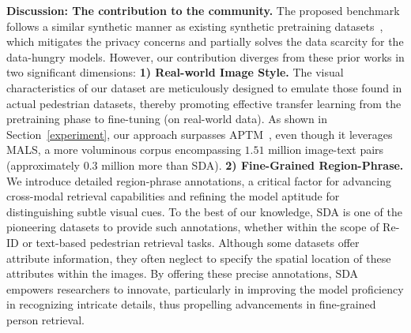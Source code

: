 \noindent\textbf{Discussion: The contribution to the community.} 
The proposed benchmark follows a similar synthetic manner as existing synthetic pretraining datasets~\cite{yang2023towards,zheng2017unlabeled}, which mitigates the privacy concerns and partially solves the data scarcity for the data-hungry models. 
However, our contribution diverges from these prior works in two significant dimensions: 
\textbf{1) Real-world Image Style.} The visual characteristics of our dataset are meticulously designed to emulate those found in actual pedestrian datasets, thereby promoting effective transfer learning from the pretraining phase to fine-tuning (on real-world data). 
As shown in Section~\ref{experiment}, our approach surpasses APTM~\cite{yang2023towards}, even though it leverages MALS, a more voluminous corpus encompassing $1.51$ million image-text pairs (approximately $0.3$ million more than SDA). 
\textbf{2) Fine-Grained Region-Phrase.} We introduce detailed region-phrase annotations, a critical factor for advancing cross-modal retrieval capabilities and refining the model aptitude for distinguishing subtle visual cues. 
To the best of our knowledge, SDA is one of the pioneering datasets to provide such annotations, whether within the scope of Re-ID or text-based pedestrian retrieval tasks. 
Although some datasets offer attribute information, they often neglect to specify the spatial location of these attributes within the images. 
By offering these precise annotations, SDA empowers researchers to innovate, particularly in improving the model proficiency in recognizing intricate details, thus propelling advancements in fine-grained person retrieval.

